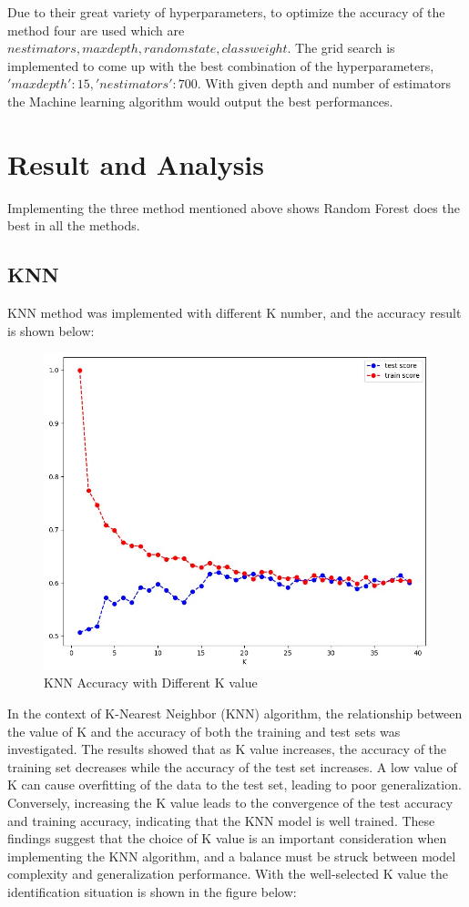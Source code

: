\documentclass[conference]{IEEEtran}
\begin{document}
{Due to their great variety of hyperparameters, to optimize the accuracy of the method four are used which are $n estimators, max depth, random state, class weight$. The grid search is implemented to come up with the best combination of the hyperparameters, $ 'max depth': 15, 'n estimators': 700$. With given depth and number of estimators the Machine learning algorithm would output the best performances.\\
	
	
\section{Result and Analysis}
Implementing the three method mentioned above shows Random Forest does the best in all the methods. 
\subsection{KNN}
KNN method was implemented with different K number, and the accuracy result is shown below:
	\begin{figure}[h]
	\label{fig:foo}
	\begin{center}
	\includegraphics[scale=0.2]{KNNDiffK.jpeg}
	\caption{KNN Accuracy with Different K value}
	\end{center}
	\end{figure}
In the context of K-Nearest Neighbor (KNN) algorithm, the relationship between the value of K and the accuracy of both the training and test sets was investigated. The results showed that as K value increases, the accuracy of the training set decreases while the accuracy of the test set increases. A low value of K can cause overfitting of the data to the test set, leading to poor generalization. Conversely, increasing the K value leads to the convergence of the test accuracy and training accuracy, indicating that the KNN model is well trained. These findings suggest that the choice of K value is an important consideration when implementing the KNN algorithm, and a balance must be struck between model complexity and generalization performance. With the well-selected K value the identification situation is shown in the figure below:
}
\end{document}
